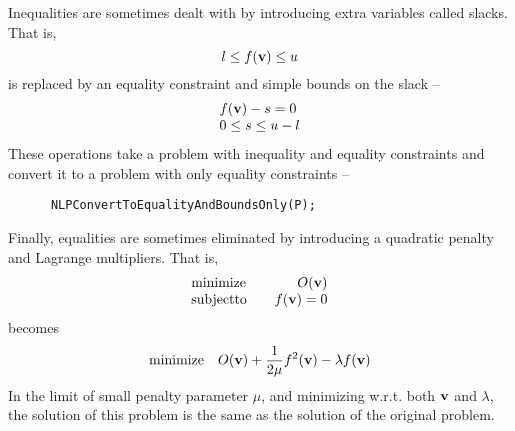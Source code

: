 \documentclass[12pt]{article}
\begin{document}
    Inequalities are sometimes dealt with by introducing extra variables called slacks. That is,
    \begin{displaymath}
      l\leq f({\bf v})\leq u
    \end{displaymath}
    is replaced by an equality constraint and simple bounds on the slack --
    \begin{displaymath}
    \begin{array}{l}
      \displaystyle f({\bf v})-s =0 \\
      \displaystyle 0\leq s \leq u-l\\
    \end{array}
    \end{displaymath}
    These operations take a problem with inequality and equality constraints and convert it to a problem
    with only equality constraints --
    \begin{verbatim}
      NLPConvertToEqualityAndBoundsOnly(P);
    \end{verbatim}

    Finally, equalities are sometimes eliminated by introducing a quadratic penalty and Lagrange multipliers.
    That is, 
    \begin{displaymath}
    \begin{array}{lr}
      \displaystyle {\rm minimize}&\displaystyle\quad O({\bf v}) \\
      \displaystyle {\rm subject to}& \displaystyle\quad f({\bf v})=0\\
    \end{array}
    \end{displaymath}
    becomes
    \begin{displaymath}
      {\rm minimize}\quad O({\bf v}) + {1\over{2\mu}}f^2({\bf v})-\lambda f({\bf v})
    \end{displaymath}
    In the limit of small penalty parameter $\mu$, and minimizing w.r.t. both ${\bf v}$ and $\lambda$, the
    solution of this problem is the same as the solution of the original problem.
\end{document}
